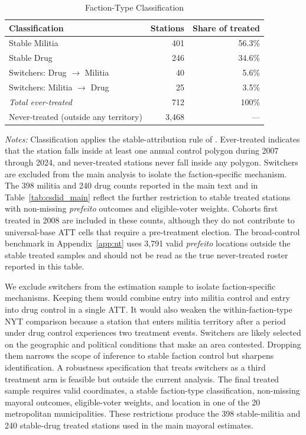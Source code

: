 \documentclass[11pt]{article}
\newcommand{\tabnotes}[1]{\par\vspace{3pt}\noindent\begin{minipage}{\linewidth}\footnotesize #1\end{minipage}}
\begin{document}
\begin{table}[H]
\centering
\caption{Faction-Type Classification}\label{tab:switchers}
\footnotesize
\begin{tabular}{@{}l r r@{}}
\toprule
Classification                            & Stations  & Share of treated \\
\midrule
Stable Militia                            &   401     & 56.3\% \\
Stable Drug                               &   246     & 34.6\% \\
Switchers: Drug $\rightarrow$ Militia     &    40     & 5.6\% \\
Switchers: Militia $\rightarrow$ Drug     &    25     & 3.5\% \\
\midrule
\textit{Total ever-treated}               &   712     & 100\%\phantom{0} \\
\midrule
Never-treated (outside any territory)     & 3{,}468   & --- \\
\bottomrule
\end{tabular}
\tabnotes{\textit{Notes:} Classification applies the stable-attribution rule of \citet{monteiro2023enterprises}. Ever-treated indicates that the station falls inside at least one annual control polygon during 2007 through 2024, and never-treated stations never fall inside any polygon. Switchers are excluded from the main analysis to isolate the faction-specific mechanism. The 398 militia and 240 drug counts reported in the main text and in Table~\ref{tab:csdid_main} reflect the further restriction to stable treated stations with non-missing \emph{prefeito} outcomes and eligible-voter weights. Cohorts first treated in 2008 are included in these counts, although they do not contribute to universal-base ATT cells that require a pre-treatment election. The broad-control benchmark in Appendix~\ref{app:nt} uses 3,791 valid \emph{prefeito} locations outside the stable treated samples and should not be read as the true never-treated roster reported in this table.}
\end{table}

We exclude switchers from the estimation sample to isolate faction-specific mechanisms. Keeping them would combine entry into militia control and entry into drug control in a single ATT. It would also weaken the within-faction-type NYT comparison because a station that enters militia territory after a period under drug control experiences two treatment events. Switchers are likely selected on the geographic and political conditions that make an area contested. Dropping them narrows the scope of inference to stable faction control but sharpens identification. A robustness specification that treats switchers as a third treatment arm is feasible but outside the current analysis. The final treated sample requires valid coordinates, a stable faction-type classification, non-missing mayoral outcomes, eligible-voter weights, and location in one of the 20 metropolitan municipalities. These restrictions produce the 398 stable-militia and 240 stable-drug treated stations used in the main mayoral estimates.
\end{document}
